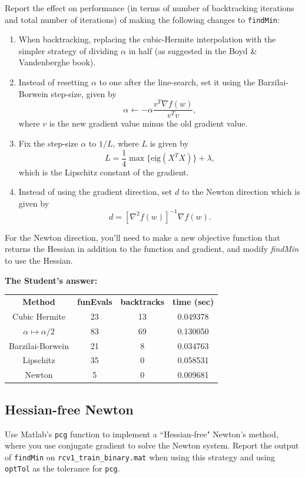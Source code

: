 \documentclass{article}
\begin{document}
Report the effect on performance (in terms of number of backtracking iterations
and total number of iterations) of making the following changes to
\texttt{findMin}:
\begin{enumerate}
\item When backtracking, replacing the cubic-Hermite interpolation with the
  simpler strategy of dividing $\alpha$ in half (as suggested in the Boyd \&
  Vandenberghe book).
\item Instead of resetting $\alpha$ to one after the line-search, set it using
  the Barzilai-Borwein step-size, given by
    \[
      \alpha \leftarrow -\alpha\frac{v^T\nabla f(w)}{v^Tv},
    \]
    where $v$ is the new gradient value minus the old gradient value.\\
  \item Fix the step-size $\alpha$ to $1/L$, where $L$ is given by
    \[
      L = \frac{1}{4}\max\{\text{eig}(X^TX)\} + \lambda,
    \]
    which is the Lipschitz constant of the gradient.
  \item Instead of using the gradient direction, set $d$ to the Newton
    direction which is given by
    \[
      d = [\nabla^2 f(w)]^{-1}\nabla f(w).
    \]
  \end{enumerate}
  For the Newton direction, you'll need to make a new objective function that
  returns the Hessian in addition to the function and gradient, and modify
  \emph{findMin} to use the Hessian.


  \textbf{The Student's answer:}

\begin{tabular}[h]{cccc}
  \textbf{Method} & \textbf{funEvals} & \textbf{backtracks} & \textbf{time (sec)}\\
  Cubic Hermite & 23 & 13 & 0.049378\\
  $\alpha \mapsto \alpha/2$ & 83 & 69 & 0.130050\\
  Barzilai-Borwein & 21 & 8 & 0.034763\\
  Lipschitz & 35 & 0 & 0.058531\\
  Newton & 5 & 0 & 0.009681
\end{tabular}

\clearpage
\subsection{Hessian-free Newton}
\label{sec:hessian-free-newton}

Use Matlab's \texttt{pcg} function to implement a ``Hessian-free" Newton's
method, where you use conjugate gradient to solve the Newton system. Report the
output of \texttt{findMin} on \texttt{rcv1\_train\_binary.mat} when using this
strategy and using \texttt{optTol} as the tolerance for \texttt{pcg}.
\end{document}
